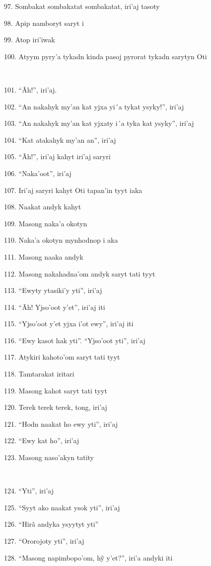 97. Sombakat sombakatat sombakatat, iri'aj tasoty

98. Apip namboryt saryt i

99. Atop iri'iwak

100. Atyym pyry'a tykadn kinda pasoj pyrorat tykadn sarytyn Oti

~

101. ``Ãh!'', iri'aj.

102. ``An nakahyk my'an kat yjxa yi´a tykat ysyky!'', iri'aj

103. ``An nakahyk my'an kat yjxaty i´a tyka kat ysyky'', iri'aj

104. ``Kat atakahyk my'an an'', iri'aj

105. ``Ãh!'', iri'aj kahyt iri'aj saryri

106. ``Naka'oot'', iri'aj

107. Iri'aj saryri kahyt Oti tapan'in tyyt iaka

108. Naakat andyk kahyt

109. Masong naka'a okotyn

110. Naka'a okotyn mynhodnop i aka

111. Masong naaka andyk

112. Masong nakahadna'om andyk saryt tati tyyt

113. ``Ewyty ytasiki'y yti'', iri'aj

114. ``Ãh! Yjso'oot y'et'', iri'aj iti

115. ``Yjso'oot y'et yjxa i'ot ewy'', iri'aj iti

116. ``Ewy kasot hak yti''.  ``Yjso'oot yti'', iri'aj

117. Atykiri kahoto'om saryt tati tyyt

118. Tamtarakat iritari

119. Masong kahot saryt tati tyyt

120. Terek terek terek, tong, iri'aj

121. ``Hodn naakat ho ewy yti'', iri'aj

122. ``Ewy kat ho'', iri'aj

123. Masong naso'akyn tatity

~

124. ``Yti'', iri'aj

125. ``Syyt ako naakat ysok yti'', iri'aj

126. ``Hirã andyka ysyytyt yti''

127. ``Ororojoty yti'', iri'aj

128. ``Masong napimbopo’om, hỹ y’et?'', iri’a andyki iti


